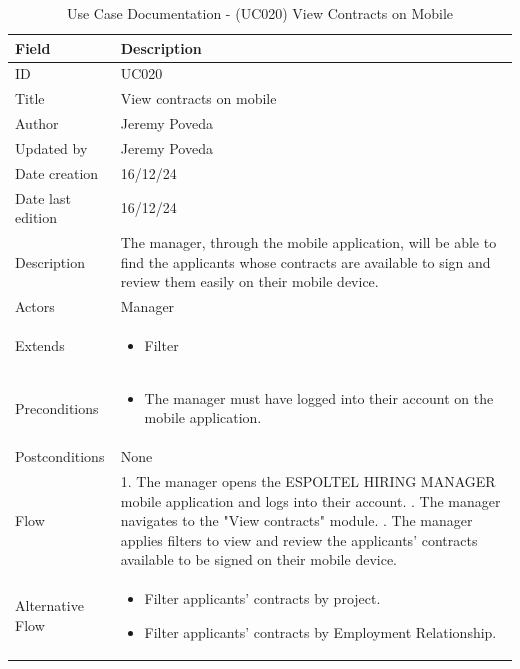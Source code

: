 \documentclass{scrreprt}
\begin{document}
\begin{table}[H]
	\centering
	\begin{tabular}{|p{3cm}|p{10cm}|}
		\hline
		\textbf{Field} & \textbf{Description} \\ \hline
		ID & UC020 \\ \hline
		Title & View contracts on mobile \\ \hline
		Author & Jeremy Poveda \\ \hline
		Updated by & Jeremy Poveda \\ \hline
		Date creation & 16/12/24 \\ \hline
		Date last edition & 16/12/24 \\ \hline
		Description & 
		The manager, through the mobile application, will be able to find the applicants whose contracts are available to sign and review them easily on their mobile device. \\ \hline
		Actors & Manager \\ \hline
		Extends & 
		\begin{itemize}
			\item Filter
		\end{itemize} \\ \hline
		Preconditions & 
		\begin{itemize}
			\item The manager must have logged into their account on the mobile application.
		\end{itemize} \\ \hline
		Postconditions & 
		None \\ \hline
		Flow & 
		1. The manager opens the ESPOLTEL HIRING MANAGER mobile application and logs into their account. \newline
		2. The manager navigates to the "View contracts" module. \newline
		3. The manager applies filters to view and review the applicants' contracts available to be signed on their mobile device. \\ \hline
		Alternative Flow & 
		\begin{itemize}
			\item Filter applicants' contracts by project.
			\item Filter applicants' contracts by Employment Relationship.
		\end{itemize} \\ \hline
	\end{tabular}
	\caption{Use Case Documentation - (UC020) View Contracts on Mobile}
	\label{table:UC020}
\end{table}
\end{document}
